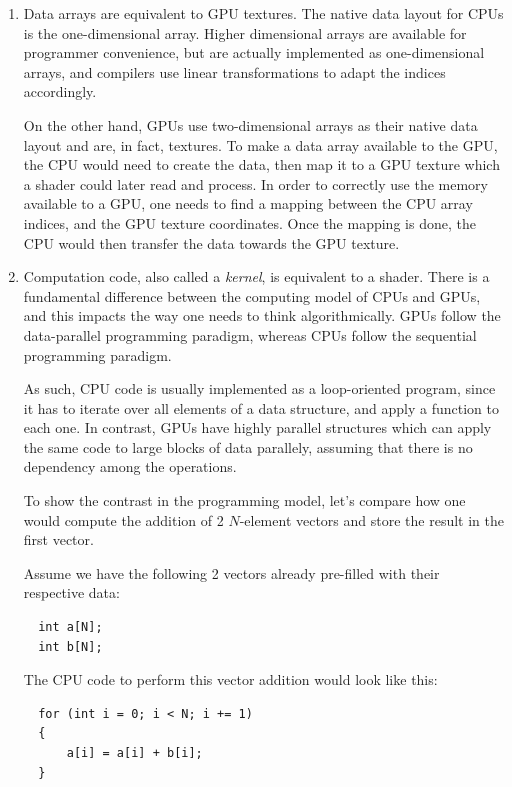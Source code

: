 \documentclass[10pt, a4paper]{report}
\begin{document}
\begin{enumerate}
\item Data arrays are equivalent to GPU textures.
The native data layout for CPUs is the one-dimensional array.
Higher dimensional arrays are available for programmer convenience, but are
actually implemented as one-dimensional arrays, and compilers use linear
transformations to adapt the indices accordingly.

On the other hand, GPUs use two-dimensional arrays as their native data layout
and are, in fact, textures.
To make a data array available to the GPU, the CPU would need to create the
data, then map it to a GPU texture which a shader could later read and process.
In order to correctly use the memory available to a GPU, one needs to find a
mapping between the CPU array indices, and the GPU texture coordinates.
Once the mapping is done, the CPU would then transfer the data towards the GPU
texture.

\item Computation code, also called a \emph{kernel}, is equivalent to a shader.
There is a fundamental difference between the computing model of CPUs and GPUs,
and this impacts the way one needs to think algorithmically.
GPUs follow the data-parallel programming paradigm, whereas CPUs follow the
sequential programming paradigm.

As such, CPU code is usually implemented as a loop-oriented program, since it
has to iterate over all elements of a data structure, and apply a function to
each one.
In contrast, GPUs have highly parallel structures which can apply the same code
to large blocks of data parallely, assuming that there is no dependency among
the operations.

To show the contrast in the programming model, let's compare how one would
compute the addition of 2 $N$-element vectors and store the result in the first
vector.

Assume we have the following 2 vectors already pre-filled with their respective
data:

\begin{verbatim}
  int a[N];
  int b[N];
\end{verbatim}

The CPU code to perform this vector addition would look like this:

\begin{verbatim}
  for (int i = 0; i < N; i += 1)
  {
      a[i] = a[i] + b[i];
  }
\end{verbatim}


\end{enumerate}
\end{document}
